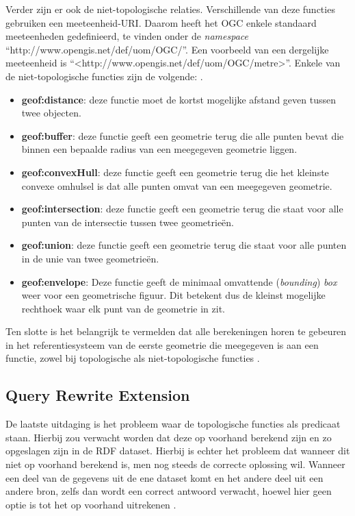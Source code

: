 Verder zijn er ook de niet-topologische relaties. Verschillende van deze functies gebruiken een meeteenheid-URI. Daarom heeft het OGC enkele standaard meeteenheden gedefinieerd, te vinden onder de \textit{namespace} ``http://www.opengis.net/def/uom/OGC/''. Een voorbeeld van een dergelijke meeteenheid is ``<http://www.opengis.net/def/uom/OGC/metre>''. Enkele van de niet-topologische functies zijn de volgende: \cite{ogcdocs}.

\begin{itemize}
    \item \textbf{geof:distance}: deze functie moet de kortst mogelijke afstand geven tussen twee objecten.
    \item \textbf{geof:buffer}: deze functie geeft een geometrie terug die alle punten bevat die binnen een bepaalde radius van een meegegeven geometrie liggen.
    \item \textbf{geof:convexHull}: deze functie geeft een geometrie terug die het kleinste convexe omhulsel is dat alle punten omvat van een meegegeven geometrie.
    \item \textbf{geof:intersection}: deze functie geeft een geometrie terug die staat voor alle punten van de intersectie tussen twee geometrieën.
    \item \textbf{geof:union}: deze functie geeft een geometrie terug die staat voor alle punten in de unie van twee geometrieën.
    \item \textbf{geof:envelope}: Deze functie geeft de minimaal omvattende (\textit{bounding}) \textit{box} weer voor een geometrische figuur. Dit betekent dus de kleinst mogelijke rechthoek waar elk punt van de geometrie in zit.
    
\end{itemize}

Ten slotte is het belangrijk te vermelden dat alle berekeningen horen te gebeuren in het referentiesysteem van de eerste geometrie die meegegeven is aan een functie, zowel bij topologische als niet-topologische functies \cite{ogcdocs}.


\subsection{Query Rewrite Extension}
\label{subsec:geosparql_rewrite_query}
De laatste uitdaging is het probleem waar de topologische functies als predicaat staan. Hierbij zou verwacht worden dat deze op voorhand berekend zijn en zo opgeslagen zijn in de RDF dataset. Hierbij is echter het probleem dat wanneer dit niet op voorhand berekend is, men nog steeds de correcte oplossing wil. Wanneer een deel van de gegevens uit de ene dataset komt en het andere deel uit een andere bron, zelfs dan wordt een correct antwoord verwacht, hoewel hier geen optie is tot het op voorhand uitrekenen \cite{ogcdocs}. 

